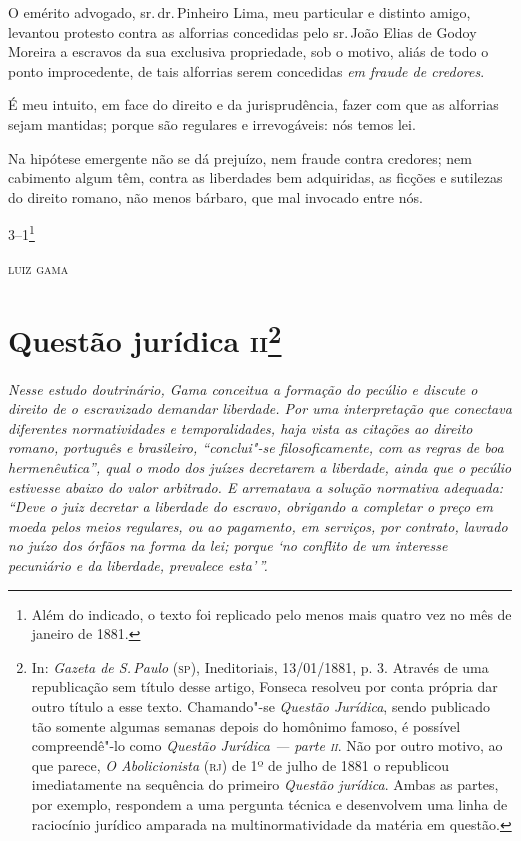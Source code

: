 \noindent{}O emérito advogado, sr.\,dr.\,Pinheiro Lima, meu particular e distinto
amigo, levantou protesto contra as alforrias concedidas pelo sr.\,João
Elias de Godoy Moreira a escravos da sua exclusiva propriedade, sob o
motivo, aliás de todo o ponto improcedente, de tais alforrias serem
concedidas \emph{em} \emph{fraude de credores}.

É meu intuito, em face do direito e da jurisprudência, fazer com que as
alforrias sejam mantidas; porque são regulares e irrevogáveis: nós temos
lei.

Na hipótese emergente não se dá prejuízo, nem fraude contra credores;
nem cabimento algum têm, contra as liberdades bem adquiridas, as ficções
e sutilezas do direito romano, não menos bárbaro, que mal invocado entre
nós.

\smallskip

\noindent{}3--1\footnote{Além do indicado, o texto foi replicado pelo menos mais
  quatro vez no mês de janeiro de 1881.}

\hfill\textsc{luiz gama}

\chapter{Questão jurídica \textsc{ii}\footnote[*]{In: \emph{Gazeta de S.\,Paulo} (\textsc{sp}), Ineditoriais,
  13/01/1881, p. 3. Através de uma republicação sem título desse artigo,
  Fonseca resolveu por conta própria dar outro título a esse texto.
  Chamando"-se \emph{Questão Jurídica}, sendo
  publicado tão somente algumas semanas depois do homônimo famoso, é possível
  compreendê"-lo como \emph{Questão Jurídica --- parte \textsc{ii}}. Não por
  outro motivo, ao que parece, \emph{O Abolicionista} (\textsc{rj}) de 1º de
  julho de 1881 o republicou imediatamente na sequência do primeiro
  \emph{Questão jurídica}. Ambas as partes, por exemplo, respondem a uma
  pergunta técnica e desenvolvem uma linha de raciocínio jurídico
  amparada na multinormatividade da matéria em questão.}}

\begin{flushleft}
{\footnotesize\itshape
Nesse estudo doutrinário, Gama conceitua a
formação do pecúlio e discute o direito de o escravizado demandar
liberdade. Por uma interpretação que conectava diferentes normatividades
e temporalidades, haja vista as citações ao direito romano, português e
brasileiro, ``conclui"-se filosoficamente, com as regras de boa
hermenêutica'', qual o modo dos juízes decretarem a
liberdade, ainda que o pecúlio estivesse abaixo do valor arbitrado. E
arrematava a solução normativa adequada: ``Deve o juiz decretar a
liberdade do escravo, obrigando a completar o preço em moeda pelos meios
regulares, ou ao pagamento, em serviços, por contrato, lavrado no juízo
dos órfãos na forma da lei; porque `no conflito de um interesse
pecuniário e da liberdade, prevalece esta'\,''. }
\end{flushleft}

